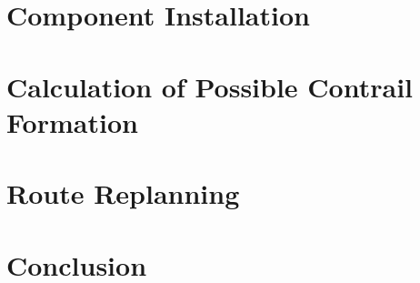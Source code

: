 \documentclass[a4paper, 12pt]{report}
\begin{document}
\chapter{Component Installation}

\chapter{Calculation of Possible Contrail Formation}

\chapter{Route Replanning}

\chapter{Conclusion}


\printbibliography
    
\end{document}
